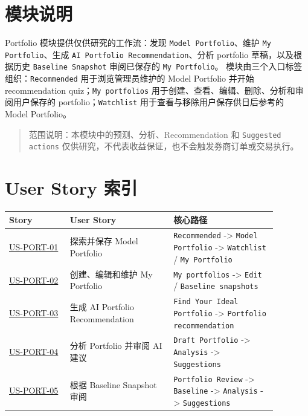 \section{模块说明}
Portfolio 模块提供仅供研究的工作流：发现 \texttt{Model Portfolio}、维护 \texttt{My Portfolio}、生成 \texttt{AI Portfolio Recommendation}、分析 portfolio 草稿，以及根据历史 \texttt{Baseline Snapshot} 审阅已保存的 \texttt{My Portfolio}。
模块由三个入口标签组织：\texttt{Recommended} 用于浏览管理员维护的 Model Portfolio 并开始 recommendation quiz；\texttt{My portfolios} 用于创建、查看、编辑、删除、分析和审阅用户保存的 portfolio；\texttt{Watchlist} 用于查看与移除用户保存供日后参考的 Model Portfolio。
\begin{quote}\small 范围说明：本模块中的预测、分析、Recommendation 和 \texttt{Suggested actions} 仅供研究，不代表收益保证，也不会触发券商订单或交易执行。\end{quote}
\section{User Story 索引}
\begingroup
\small
\begin{longtable}{L{0.20\linewidth}L{0.34\linewidth}L{0.34\linewidth}}
\toprule
\textbf{Story} & \textbf{User Story} & \textbf{核心路径} \\
\midrule
\hyperlink{us-port-01}{US-PORT-01} & 探索并保存 Model Portfolio & \texttt{Recommended} -\textgreater{} \texttt{Model Portfolio} -\textgreater{} \texttt{Watchlist} /\allowbreak{} \texttt{My Portfolio} \\
\hyperlink{us-port-02}{US-PORT-02} & 创建、编辑和维护 My Portfolio & \texttt{My portfolios} -\textgreater{} \texttt{Edit} /\allowbreak{} \texttt{Baseline snapshots} \\
\hyperlink{us-port-03}{US-PORT-03} & 生成 AI Portfolio Recommendation & \texttt{Find Your Ideal Portfolio} -\textgreater{} \texttt{Portfolio recommendation} \\
\hyperlink{us-port-04}{US-PORT-04} & 分析 Portfolio 并审阅 AI 建议 & \texttt{Draft Portfolio} -\textgreater{} \texttt{Analysis} -\textgreater{} \texttt{Suggestions} \\
\hyperlink{us-port-05}{US-PORT-05} & 根据 Baseline Snapshot 审阅 & \texttt{Portfolio Review} -\textgreater{} \texttt{Baseline} -\textgreater{} \texttt{Analysis} -\textgreater{} \texttt{Suggestions} \\
\bottomrule
\end{longtable}
\endgroup
